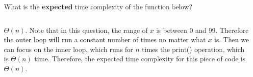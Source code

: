 \begin{prob}
    What is the \textbf{expected} time complexity of the function below?

    \inputminted{python}{./code.py}

    \begin{soln}
        $\Theta(n)$. Note that in this question, the range of $x$ is between 0 and 99. Therefore the outer loop will run a constant number of times no matter what 
        $x$ is. Then we can focus on the inner loop, which runs for $n$ times the print() operation, which is $\Theta(n)$ time. Therefore, the expected time complexity 
        for this piece of code is $\Theta(n)$.
    \end{soln}

\end{prob}

